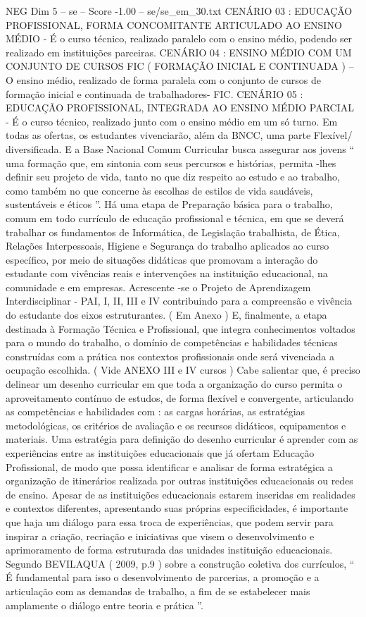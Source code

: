 \begin{textsample}{NEG Dim 5 – se – Score -1.00 – se/se\_em\_30.txt}
CENÁRIO 03 : EDUCAÇÃO PROFISSIONAL, FORMA CONCOMITANTE ARTICULADO AO ENSINO MÉDIO - É o curso técnico, realizado paralelo com o ensino médio, podendo ser realizado em instituições parceiras.
CENÁRIO 04 : ENSINO MÉDIO COM UM CONJUNTO DE CURSOS FIC ( FORMAÇÃO INICIAL E CONTINUADA ) – O ensino médio, realizado de forma paralela com o conjunto de cursos de formação inicial e continuada de trabalhadores- FIC.
CENÁRIO 05 : EDUCAÇÃO PROFISSIONAL, INTEGRADA AO ENSINO MÉDIO PARCIAL - É o curso técnico, realizado junto com o ensino médio em um só turno.
Em todas as ofertas, os estudantes vivenciarão, além da BNCC, uma parte Flexível/ diversificada.
E a Base Nacional Comum Curricular busca assegurar aos jovens “ uma formação que, em sintonia com seus percursos e histórias, permita -lhes definir seu projeto de vida, tanto no que diz respeito ao estudo e ao trabalho, como também no que concerne às escolhas de estilos de vida saudáveis, sustentáveis e éticos ”.
Há uma etapa de Preparação básica para o trabalho, comum em todo currículo de educação profissional e técnica, em que se deverá trabalhar os fundamentos de Informática, de Legislação trabalhista, de Ética, Relações Interpessoais, Higiene e Segurança do trabalho aplicados ao curso específico, por meio de situações didáticas que promovam a interação do estudante com vivências reais e intervenções na instituição educacional, na comunidade e em empresas.
Acrescente -se o Projeto de Aprendizagem Interdisciplinar - PAI, I, II, III e IV contribuindo para a compreensão e vivência do estudante dos eixos estruturantes. ( Em Anexo ) E, finalmente, a etapa destinada à Formação Técnica e Profissional, que integra conhecimentos voltados para o mundo do trabalho, o domínio de competências e habilidades técnicas construídas com a prática nos contextos profissionais onde será vivenciada a ocupação escolhida. ( Vide ANEXO III e IV cursos ) Cabe salientar que, é preciso delinear um desenho curricular em que toda a organização do curso permita o aproveitamento contínuo de estudos, de forma flexível e convergente, articulando as competências e habilidades com : as cargas horárias, as estratégias metodológicas, os critérios de avaliação e os recursos didáticos, equipamentos e materiais.
Uma estratégia para definição do desenho curricular é aprender com as experiências entre as instituições educacionais que já ofertam Educação Profissional, de modo que possa identificar e analisar de forma estratégica a organização de itinerários realizada por outras instituições educacionais ou redes de ensino.
Apesar de as instituições educacionais estarem inseridas em realidades e contextos diferentes, apresentando suas próprias especificidades, é importante que haja um diálogo para essa troca de experiências, que podem servir para inspirar a criação, recriação e iniciativas que visem o desenvolvimento e aprimoramento de forma estruturada das unidades instituição educacionais.
Segundo BEVILAQUA ( 2009, p.9 ) sobre a construção coletiva dos currículos, “ É fundamental para isso o desenvolvimento de parcerias, a promoção e a articulação com as demandas de trabalho, a fim de se estabelecer mais amplamente o diálogo entre teoria e prática ”.

\end{textsample}

